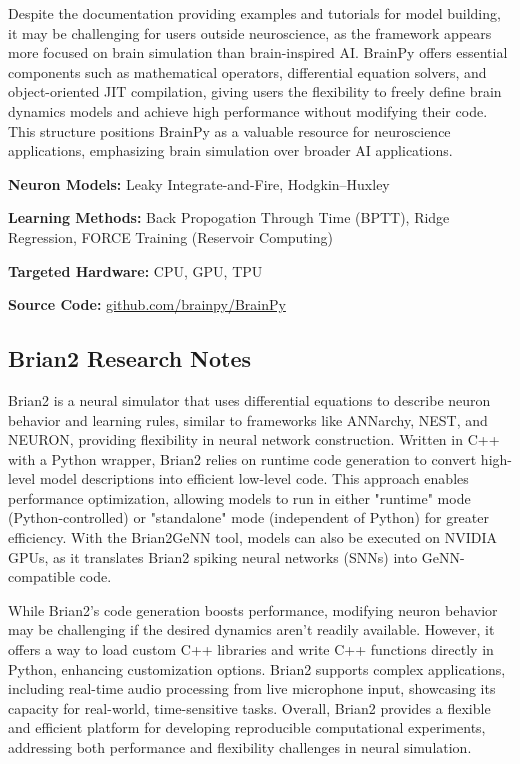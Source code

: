 Despite the documentation providing examples and tutorials for model building, it may be challenging for users outside neuroscience, as the framework appears more focused on brain simulation than brain-inspired AI. BrainPy offers essential components such as mathematical operators, differential equation solvers, and object-oriented JIT compilation, giving users the flexibility to freely define brain dynamics models and achieve high performance without modifying their code. This structure positions BrainPy as a valuable resource for neuroscience applications, emphasizing brain simulation over broader AI applications.

\begin{tcolorbox}[enhanced,attach boxed title to top center={yshift=-3mm,yshifttext=-1mm}, colback=blue!5!white,colframe=blue!75!black,colbacktitle=red!80!black, title=BrainPy at a Glance,fonttitle=\bfseries, boxed title style={size=small,colframe=red!50!black} ]

\textbf{Neuron Models:} Leaky Integrate-and-Fire, Hodgkin–Huxley

\textbf{Learning Methods:} Back Propogation Through Time (BPTT), Ridge Regression, FORCE Training (Reservoir Computing)  

\textbf{Targeted Hardware:} CPU, GPU, TPU 

\textbf{Source Code:} \href{https://github.com/brainpy/BrainPy}{github.com/brainpy/BrainPy}
\end{tcolorbox}
\subsection*{Brian2 Research Notes}\label{Brian2}

Brian2 is a neural simulator that uses differential equations to describe neuron behavior and learning rules, similar to frameworks like ANNarchy, NEST, and NEURON, providing flexibility in neural network construction. Written in C++ with a Python wrapper, Brian2 relies on runtime code generation to convert high-level model descriptions into efficient low-level code. This approach enables performance optimization, allowing models to run in either "runtime" mode (Python-controlled) or "standalone" mode (independent of Python) for greater efficiency. With the Brian2GeNN tool, models can also be executed on NVIDIA GPUs, as it translates Brian2 spiking neural networks (SNNs) into GeNN-compatible code.

While Brian2's code generation boosts performance, modifying neuron behavior may be challenging if the desired dynamics aren’t readily available. However, it offers a way to load custom C++ libraries and write C++ functions directly in Python, enhancing customization options. Brian2 supports complex applications, including real-time audio processing from live microphone input, showcasing its capacity for real-world, time-sensitive tasks. Overall, Brian2 provides a flexible and efficient platform for developing reproducible computational experiments, addressing both performance and flexibility challenges in neural simulation.

